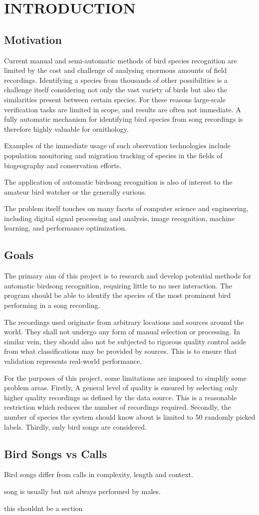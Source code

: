 \chapter{INTRODUCTION}

\section{Motivation}
Current manual and semi-automatic methods of bird species recognition are limited
by the cost and challenge of analysing enormous amounts of field recordings.
Identifying a species from thousands of other possibilities is a challenge itself
considering not only the vast variety of birds but also the similarities
present between certain species.
For these reasons large-scale verification tasks are limited in scope, and results
are often not immediate.
A fully automatic mechanism for identifying bird species from song recordings is
therefore highly valuable for ornithology.

Examples of the immediate usage of such observation technologies include
population monitoring and migration tracking of species in the fields of
biogeography and conservation efforts.

The application of automatic birdsong recognition is also of interest to the
amateur bird watcher or the generally curious.

The problem itself touches on many facets of computer science and engineering,
including digital signal processing and analysis, image recognition,
machine learning, and performance optimization.

\section{Goals}
The primary aim of this project is to research and develop potential methods
for automatic birdsong recognition, requiring little to no user interaction.
The program should be able to identify the species of the most prominent bird
performing in a song recording.

The recordings used originate from arbitrary locations and sources around the
world.
They shall not undergo any form of manual selection or processing.
In similar vein, they should also not be subjected to rigorous quality control
aside from what classifications may be provided by sources.
This is to ensure that validation represents real-world performance.

For the purposes of this project, some limitations are imposed to simplify some
problem areas.
Firstly, A general level of quality is ensured by selecting only higher quality recordings
as defined by the data source.
This is a reasonable restriction which reduces the number of recordings required.
Secondly, the number of species the system should know about is limited to 50
randomly picked labels.
Thirdly, only bird songs are considered.

\section{Bird Songs vs Calls}
Bird songs differ from calls in complexity, length and context.

song is usually but not always performed by males.

this shouldnt be a section
